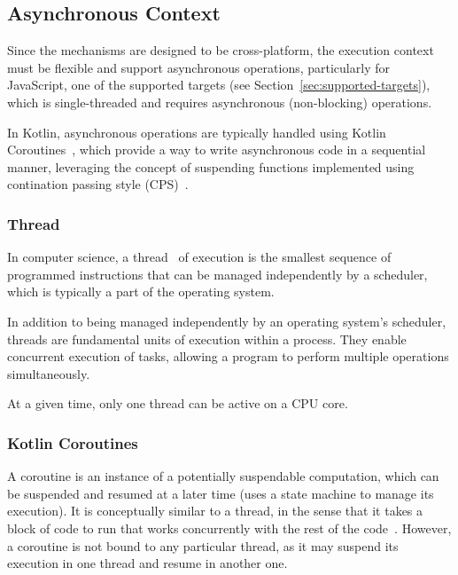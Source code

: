 \subsection{Asynchronous Context}\label{subsec:asynchronous-context}

Since the mechanisms are designed to be cross-platform, the execution context must be flexible and support asynchronous operations, particularly for JavaScript, one of the supported targets (see Section~\ref{sec:supported-targets}), which is single-threaded and requires asynchronous (non-blocking) operations.

In Kotlin, asynchronous operations are typically handled using Kotlin Coroutines~\cite{kotlin-coroutines},
which provide a way to write asynchronous code in a sequential manner,
leveraging the concept of suspending functions implemented using contination passing style (CPS)~\cite{continuation-passing-style}.

\subsubsection{Thread}\label{subsubsec:thread}

In computer science, a thread~\cite{java-thread} of execution is the smallest sequence of programmed instructions that can be managed independently by a scheduler, which is typically a part of the operating system.

In addition to being managed independently by an operating system's scheduler, threads are fundamental units of execution within a process.
They enable concurrent execution of tasks, allowing a program to perform multiple operations simultaneously.

At a given time, only one thread can be active on a CPU core.

\subsubsection{Kotlin Coroutines}\label{subsubsec:kotlin-coroutines}

A coroutine is an instance of a potentially suspendable computation,
which can be suspended and resumed at a later time (uses a state machine to manage its execution).
It is conceptually similar to a thread,
in the sense that it takes a block of code
to run that works concurrently with the rest of the code~\cite{kotlin-coroutines}.
However, a coroutine is not bound to any particular thread,
as it may suspend its execution in one thread and resume in another one.

